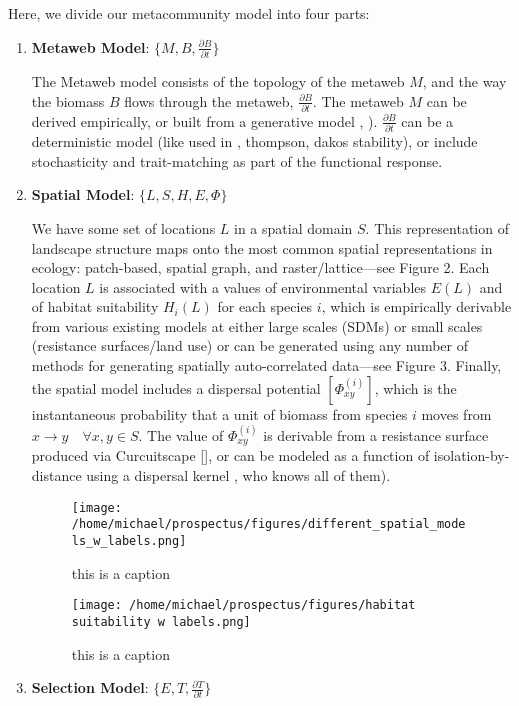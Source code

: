 \documentclass[]{article}
\begin{document}
Here, we divide our metacommunity model into four parts:

\begin{enumerate}
\def\labelenumi{\arabic{enumi}.}
\item
  \textbf{Metaweb Model}: \(\{M, B, \frac{\partial B}{\partial t}\}\)

  The Metaweb model consists of the topology of the metaweb \(M\), and
  the way the biomass \(B\) flows through the metaweb,
  \(\frac{\partial B}{\partial t}\). The metaweb \(M\) can be derived
  empirically, or built from a generative model
  \citep{williams_martinez}, \citep{allesina}).
  \(\frac{\partial B}{\partial t}\) can be a deterministic model (like
  used in \citep{delmas}, thompson, dakos stability), or include
  stochasticity and trait-matching as part of the functional response.
\item
  \textbf{Spatial Model}: \(\{L, S, H, E, \Phi \}\)

  We have some set of locations \(L\) in a spatial domain \(S\). This
  representation of landscape structure maps onto the most common
  spatial representations in ecology: patch-based, spatial graph, and
  raster/lattice---see Figure 2. Each location \(L\) is associated with
  a values of environmental variables \(E(L)\) and of habitat
  suitability \(H_i(L)\) for each species \(i\), which is empirically
  derivable from various existing models at either large scales (SDMs)
  or small scales (resistance surfaces/land use) or can be generated
  using any number of methods for generating spatially auto-correlated
  data---see Figure 3. Finally, the spatial model includes a dispersal
  potential \([\Phi^{(i)}_{xy}]\), which is the instantaneous
  probability that a unit of biomass from species \(i\) moves from
  \(x \to y \quad \forall x,y \in S\). The value of \(\Phi^{(i)}_{xy}\)
  is derivable from a resistance surface produced via Curcuitscape
  {[}\citep{cite}{]}, or can be modeled as a function of
  isolation-by-distance using a dispersal kernel \citep{hanski}, who
  knows all of them).

  \begin{figure}[H]
  \centering
  \texttt{[image: /home/michael/prospectus/figures/different\_spatial\_models\_w\_labels.png]}
  \caption{this is a caption}
  \end{figure}

  \begin{figure}[H]
  \centering
  \texttt{[image: /home/michael/prospectus/figures/habitat suitability w labels.png]}
  \caption{this is a caption}
  \end{figure}
\item
  \textbf{Selection Model}: \(\{ E, T, \frac{\partial T}{\partial t}\}\)


\end{enumerate}
\end{document}
